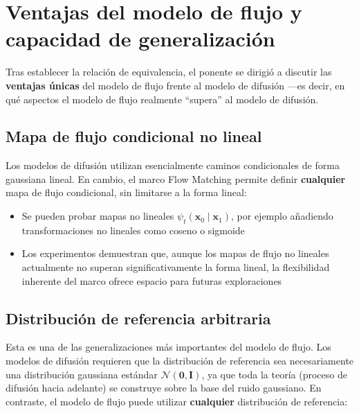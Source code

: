 \section{Ventajas del modelo de flujo y capacidad de generalización}

Tras establecer la relación de equivalencia, el ponente se dirigió a discutir las \textbf{ventajas únicas} del modelo de flujo frente al modelo de difusión —es decir, en qué aspectos el modelo de flujo realmente ``supera'' al modelo de difusión.

\subsection{Mapa de flujo condicional no lineal}

Los modelos de difusión utilizan esencialmente caminos condicionales de forma gaussiana lineal. En cambio, el marco Flow Matching permite definir \textbf{cualquier} mapa de flujo condicional, sin limitarse a la forma lineal:

\begin{itemize}
    \item Se pueden probar mapas no lineales $\psi_t(\mathbf{x}_0 \mid \mathbf{x}_1)$, por ejemplo añadiendo transformaciones no lineales como coseno o sigmoide
    \item Los experimentos demuestran que, aunque los mapas de flujo no lineales actualmente no superan significativamente la forma lineal, la flexibilidad inherente del marco ofrece espacio para futuras exploraciones
\end{itemize}

\subsection{Distribución de referencia arbitraria}

Esta es una de las generalizaciones más importantes del modelo de flujo. Los modelos de difusión requieren que la distribución de referencia sea necesariamente una distribución gaussiana estándar $\mathcal{N}(\mathbf{0}, \mathbf{I})$, ya que toda la teoría (proceso de difusión hacia adelante) se construye sobre la base del ruido gaussiano. En contraste, el modelo de flujo puede utilizar \textbf{cualquier} distribución de referencia:

